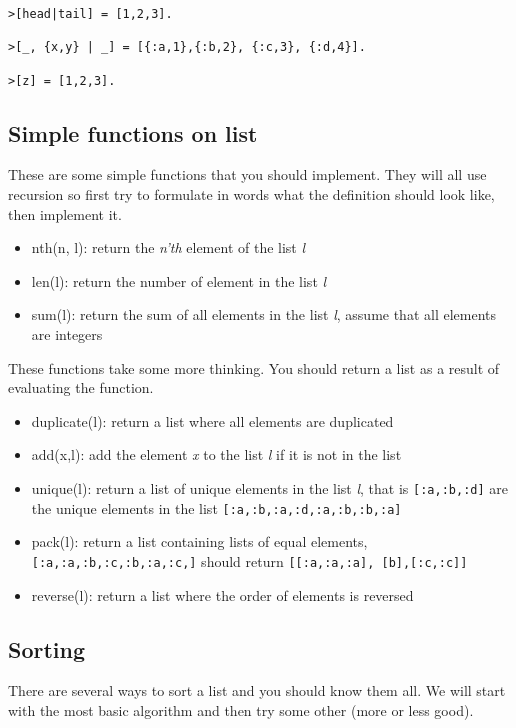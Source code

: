 \documentclass[a4paper,11pt]{article}
\begin{document}
{\begin{verbatim}
>[head|tail] = [1,2,3].

>[_, {x,y} | _] = [{:a,1},{:b,2}, {:c,3}, {:d,4}].

>[z] = [1,2,3].
\end{verbatim}

\subsection{Simple functions on list}

These are some simple functions that you should implement. They will
all use recursion so first try to formulate in words what the
definition should look like, then implement it.

\begin{itemize}
\item nth(n, l): return the {\em n'th} element of the list {\em l}
\item len(l): return the number of element in the list  {\em l}
\item sum(l): return the sum of all elements in the list  {\em l}, assume
  that all elements are integers
\end{itemize}


These functions take some more thinking. You should return a list as a
result of evaluating the function.

\begin{itemize}
\item duplicate(l): return a list where all elements are duplicated
\item add(x,l): add the element {\em x} to the list {\em l} if it is not in the list
\item unique(l): return a list of unique elements in the list  {\em l}, that is {\tt [:a,:b,:d]} are the unique elements in the list {\tt [:a,:b,:a,:d,:a,:b,:b,:a]}
\item pack(l): return a list containing lists of equal elements, {\tt
  [:a,:a,:b,:c,:b,:a,:c,]} should return {\tt [[:a,:a,:a], [b],[:c,:c]]}
\item reverse(l): return a list where the order of elements is reversed
\end{itemize}



\subsection{Sorting}

There are several ways to sort a list and you should know them all. We
will start with the most basic algorithm and then try some other (more or less good).

}
\end{document}
